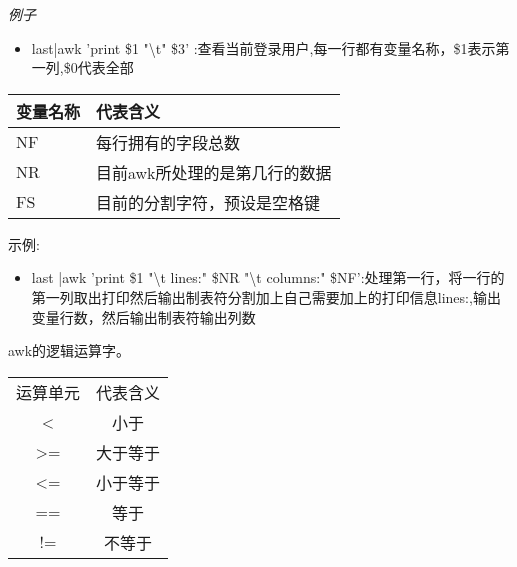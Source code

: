 \textit{例子}
\begin{itemize}
	\item  last|awk '{print \$1 "\textbackslash t" \$3}' :查看当前登录用户,每一行都有变量名称，\$1表示第一列,\$0代表全部
	
\end{itemize}
\begin{table}[h!]
\centering
\begin{tabular}{ |p{3cm}|p{3cm}|  }
	\hline 
	变量名称 & 代表含义 \\
	\hline
	NF & 每行拥有的字段总数 \\
	NR    &目前awk所处理的是第几行的数据\\
	FS & 目前的分割字符，预设是空格键 \\
	\hline
\end{tabular}
\end{table}
示例:
\begin{itemize}
		\item last |awk '{print \$1 "\textbackslash t lines:" \$NR "\textbackslash t columns:" \$NF}':处理第一行，将一行的第一列取出打印然后输出制表符分割加上自己需要加上的打印信息lines:,输出变量行数，然后输出制表符输出列数
\end{itemize}
awk的逻辑运算字。
\begin{table}[h]
\centering
	\begin{tabular}{|c|c|}
		\hline
		运算单元&代表含义\\
		<&小于\\
		>=&大于等于\\
		<=&小于等于\\
		==&等于\\
		!=&不等于\\
		\hline
	\end{tabular}
\end{table}

